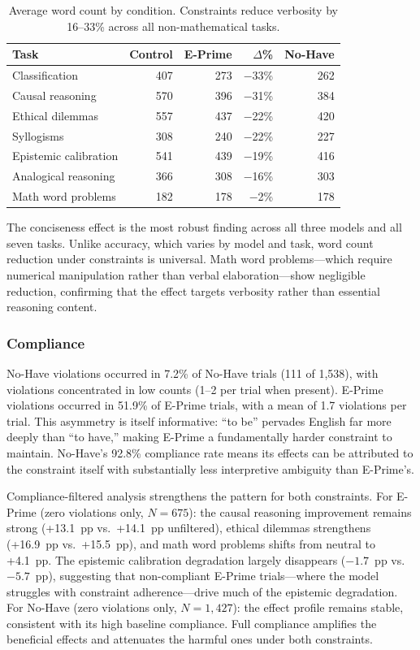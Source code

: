 \documentclass[11pt,a4paper]{article}
\begin{document}
\begin{table}[H]
\centering
\caption{Average word count by condition. Constraints reduce verbosity by 16--33\% across all non-mathematical tasks.}
\label{tab:wordcount}
\smallskip
\begin{tabular}{@{}lrrrr@{}}
\toprule
Task & Control & E-Prime & $\Delta$\% & No-Have \\
\midrule
Classification        & 407 & 273 & $-$33\% & 262 \\
Causal reasoning      & 570 & 396 & $-$31\% & 384 \\
Ethical dilemmas      & 557 & 437 & $-$22\% & 420 \\
Syllogisms            & 308 & 240 & $-$22\% & 227 \\
Epistemic calibration & 541 & 439 & $-$19\% & 416 \\
Analogical reasoning  & 366 & 308 & $-$16\% & 303 \\
Math word problems    & 182 & 178 & $-$2\%  & 178 \\
\bottomrule
\end{tabular}
\end{table}

The conciseness effect is the most robust finding across all three models and all seven tasks. Unlike accuracy, which varies by model and task, word count reduction under constraints is universal. Math word problems---which require numerical manipulation rather than verbal elaboration---show negligible reduction, confirming that the effect targets verbosity rather than essential reasoning content.

\subsubsection{Compliance}

No-Have violations occurred in 7.2\% of No-Have trials (111 of 1,538), with violations concentrated in low counts (1--2 per trial when present). E-Prime violations occurred in 51.9\% of E-Prime trials, with a mean of 1.7 violations per trial. This asymmetry is itself informative: ``to be'' pervades English far more deeply than ``to have,'' making E-Prime a fundamentally harder constraint to maintain. No-Have's 92.8\% compliance rate means its effects can be attributed to the constraint itself with substantially less interpretive ambiguity than E-Prime's.

Compliance-filtered analysis strengthens the pattern for both constraints. For E-Prime (zero violations only, $N{=}675$): the causal reasoning improvement remains strong (+13.1~pp vs.\ +14.1~pp unfiltered), ethical dilemmas strengthens (+16.9~pp vs.\ +15.5~pp), and math word problems shifts from neutral to +4.1~pp. The epistemic calibration degradation largely disappears ($-1.7$~pp vs.\ $-5.7$~pp), suggesting that non-compliant E-Prime trials---where the model struggles with constraint adherence---drive much of the epistemic degradation. For No-Have (zero violations only, $N{=}1{,}427$): the effect profile remains stable, consistent with its high baseline compliance. Full compliance amplifies the beneficial effects and attenuates the harmful ones under both constraints.
\end{document}
